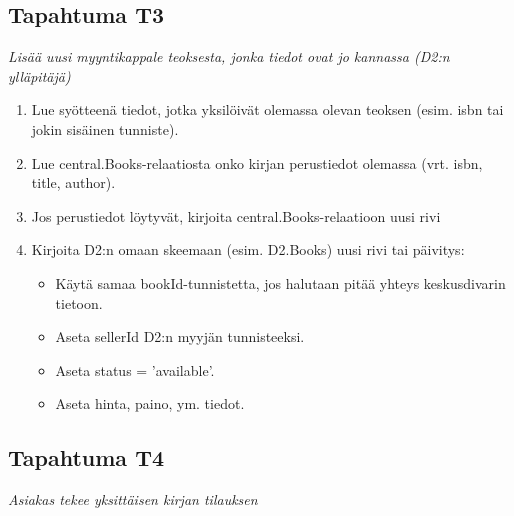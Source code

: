 \documentclass[11pt,a4paper]{article}
\begin{document}
\subsection{Tapahtuma T3}
{\large{\textit{Lisää uusi myyntikappale teoksesta, jonka tiedot ovat jo kannassa (D2:n ylläpitäjä)}}}

\begin{enumerate}
	\item Lue syötteenä tiedot, jotka yksilöivät olemassa olevan teoksen (esim. isbn tai jokin sisäinen tunniste).
	\item Lue central.Books-relaatiosta onko kirjan perustiedot olemassa (vrt. isbn, title, author).
	\item Jos perustiedot löytyvät, kirjoita central.Books-relaatioon uusi rivi
	\item Kirjoita D2:n omaan skeemaan (esim. D2.Books) uusi rivi tai päivitys:
	      \begin{itemize}
		      \item Käytä samaa bookId-tunnistetta, jos halutaan pitää yhteys keskusdivarin tietoon.
		      \item Aseta sellerId D2:n myyjän tunnisteeksi.
		      \item Aseta status = 'available'.
		      \item Aseta hinta, paino, ym. tiedot.
	      \end{itemize}
\end{enumerate}

\subsection{Tapahtuma T4}
{\large{\textit{Asiakas tekee yksittäisen kirjan tilauksen}}}
\end{document}

